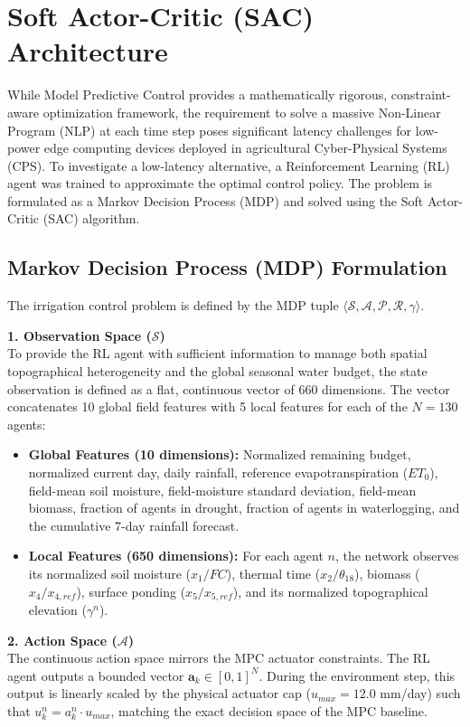 \documentclass[11pt, a4paper]{article}
\begin{document}
\section{Soft Actor-Critic (SAC) Architecture}

While Model Predictive Control provides a mathematically rigorous, constraint-aware optimization framework, the requirement to solve a massive Non-Linear Program (NLP) at each time step poses significant latency challenges for low-power edge computing devices deployed in agricultural Cyber-Physical Systems (CPS). To investigate a low-latency alternative, a Reinforcement Learning (RL) agent was trained to approximate the optimal control policy. The problem is formulated as a Markov Decision Process (MDP) and solved using the Soft Actor-Critic (SAC) algorithm.

\subsection{Markov Decision Process (MDP) Formulation}
The irrigation control problem is defined by the MDP tuple $\langle \mathcal{S}, \mathcal{A}, \mathcal{P}, \mathcal{R}, \gamma \rangle$.

\textbf{1. Observation Space ($\mathcal{S}$)} \\
To provide the RL agent with sufficient information to manage both spatial topographical heterogeneity and the global seasonal water budget, the state observation is defined as a flat, continuous vector of 660 dimensions. The vector concatenates 10 global field features with 5 local features for each of the $N=130$ agents:
\begin{itemize}
    \item \textbf{Global Features (10 dimensions):} Normalized remaining budget, normalized current day, daily rainfall, reference evapotranspiration ($ET_0$), field-mean soil moisture, field-moisture standard deviation, field-mean biomass, fraction of agents in drought, fraction of agents in waterlogging, and the cumulative 7-day rainfall forecast.
    \item \textbf{Local Features (650 dimensions):} For each agent $n$, the network observes its normalized soil moisture ($x_1/FC$), thermal time ($x_2/\theta_{18}$), biomass ($x_4/x_{4,ref}$), surface ponding ($x_5/x_{5,ref}$), and its normalized topographical elevation ($\gamma^n$).
\end{itemize}

\textbf{2. Action Space ($\mathcal{A}$)} \\
The continuous action space mirrors the MPC actuator constraints. The RL agent outputs a bounded vector $\mathbf{a}_k \in [0, 1]^N$. During the environment step, this output is linearly scaled by the physical actuator cap ($u_{max} = 12.0$ mm/day) such that $u^n_k = a^n_k \cdot u_{max}$, matching the exact decision space of the MPC baseline.
\end{document}
